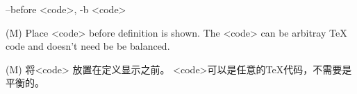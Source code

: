 \documentclass{article}
\newenvironment{options}{%
    \def\cstart{\begingroup\ttfamily\par\noindent\ignorespaces}%
    \def\csep{\endgroup\begingroup\list {}{}\item \relax}%
    \def\cend{\endlist\par\medskip\endgroup\cstart}%
    \cstart
}{%
    \endgroup
}
\begin{document}
\begin{options}
  --before \MacroArgs<code>, -b \MacroArgs<code>     \csep 
(M) Place \MacroArgs<code> before definition is shown. 
The \MacroArgs<code> can be arbitray TeX code and doesn't need be be balanced.

(M) 将\MacroArgs <code> 放置在定义显示之前。 \MacroArgs <code>可以是任意的TeX代码，不需要是平衡的。
\cend 
\end{options}


  
  
  
  
  
\end{document}
